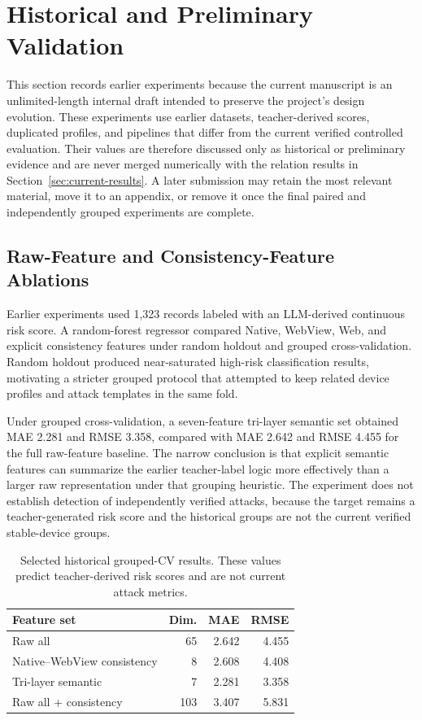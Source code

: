 \section{Historical and Preliminary Validation}
\label{sec:historical}

This section records earlier experiments because the current manuscript is an unlimited-length internal draft intended to preserve the project's design evolution. These experiments use earlier datasets, teacher-derived scores, duplicated profiles, and pipelines that differ from the current verified controlled evaluation. Their values are therefore discussed only as historical or preliminary evidence and are never merged numerically with the \appfp relation results in Section~\ref{sec:current-results}. A later submission may retain the most relevant material, move it to an appendix, or remove it once the final paired and independently grouped experiments are complete.

\subsection{Raw-Feature and Consistency-Feature Ablations}

Earlier experiments used 1,323 records labeled with an LLM-derived continuous risk score. A random-forest regressor compared Native, WebView, Web, and explicit consistency features under random holdout and grouped cross-validation. Random holdout produced near-saturated high-risk classification results, motivating a stricter grouped protocol that attempted to keep related device profiles and attack templates in the same fold.

Under grouped cross-validation, a seven-feature tri-layer semantic set obtained MAE 2.281 and RMSE 3.358, compared with MAE 2.642 and RMSE 4.455 for the full raw-feature baseline. The narrow conclusion is that explicit semantic features can summarize the earlier teacher-label logic more effectively than a larger raw representation under that grouping heuristic. The experiment does not establish detection of independently verified attacks, because the target remains a teacher-generated risk score and the historical groups are not the current verified stable-device groups.

\begin{table}[t]
\caption{Selected historical grouped-CV results. These values predict teacher-derived risk scores and are not current attack metrics.}
\label{tab:historical-grouped}
\small
\begin{tabular}{@{}lrrr@{}}
\toprule
Feature set & Dim. & MAE & RMSE \\
\midrule
Raw all & 65 & 2.642 & 4.455 \\
Native--WebView consistency & 8 & 2.608 & 4.408 \\
Tri-layer semantic & 7 & 2.281 & 3.358 \\
Raw all + consistency & 103 & 3.407 & 5.831 \\
\bottomrule
\end{tabular}
\end{table}

